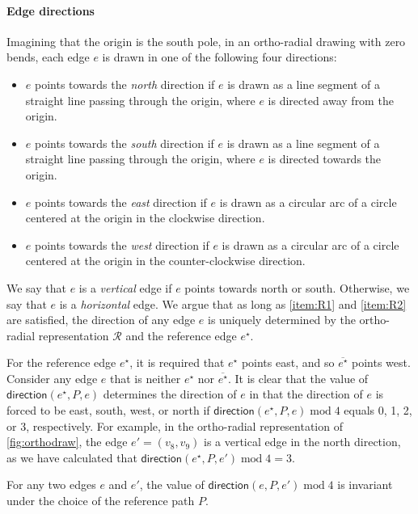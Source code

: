 \documentclass{article}\usepackage[a4paper,margin=20mm]{geometry}
\newcommand{\RR}{\mathcal{R}}
\newcommand{\direction}{\mathsf{direction}}
\newcommand{\eref}{e^\star}
\renewcommand{\mod}{\operatorname{mod}}
\begin{document}
\paragraph{Edge directions} Imagining that the origin is the south pole, in an ortho-radial drawing with zero bends, each edge $e$ is drawn in one of the following four directions: 
\begin{itemize}
\item $e$ points towards the \emph{north} direction if $e$ is drawn as a line segment of a straight line passing through the origin, where $e$ is directed away from the origin.
\item $e$ points towards the \emph{south} direction if $e$ is drawn as a line segment of a straight line passing through the origin, where $e$ is directed towards the origin.
\item $e$ points towards the \emph{east} direction if $e$ is drawn as a circular arc of a circle centered at the origin in the clockwise direction.
\item $e$ points towards the \emph{west} direction if $e$ is drawn as a circular arc of a circle centered at the origin in the counter-clockwise direction.
\end{itemize}

We say that $e$ is a \emph{vertical} edge if $e$ points towards north or south.  Otherwise, we say that $e$ is a \emph{horizontal} edge. We argue that as long as  \ref{item:R1} and \ref{item:R2} are satisfied,  the direction of any edge $e$ is uniquely determined by the ortho-radial representation $\RR$ and the reference edge $\eref$. 


For the reference edge $\eref$, it is required that $\eref$ points east, and so $\overline{\eref}$ points west. 
Consider any edge $e$ that is neither $\eref$ nor $\overline{\eref}$. It is clear that the value of $\direction(\eref, P, e)$ determines the direction of $e$ in that the direction of $e$ is forced to be east, south, west, or north if $\direction(\eref, P, e) \mod 4$ equals 0, 1, 2, or 3, respectively. For example, in the ortho-radial representation of \cref{fig:orthodraw}, the edge $e' = (v_8, v_9)$ is a vertical edge in the north direction, as we have calculated that  $\direction(\eref, P, e') \mod 4 = 3$.

\begin{lemma}\label{lem-prelim-dir-1}
For any two edges $e$ and $e'$, the value of $\direction(e, P, e') \mod 4$ is invariant under the choice of the reference path $P$.
\end{lemma}
\end{document}
